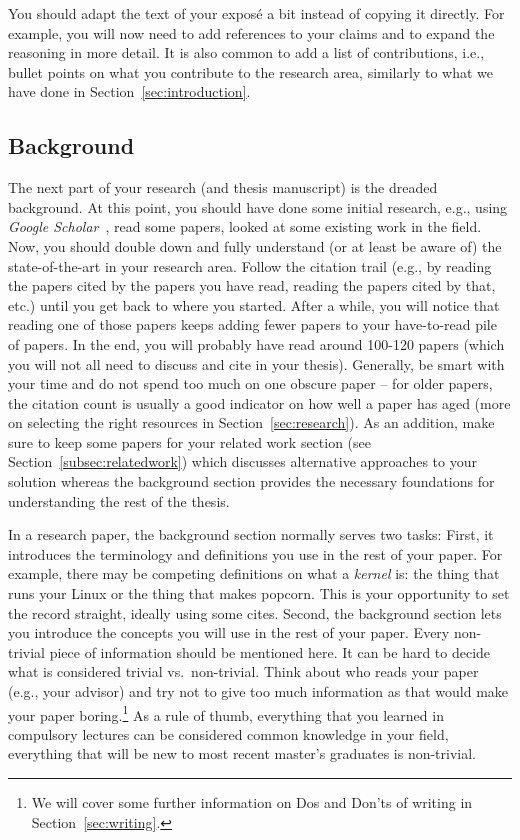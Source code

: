 \documentclass[a4]{article}
\begin{document}
You should adapt the text of your expos\'e a bit instead of copying it directly.
For example, you will now need to add references to your claims and to expand the reasoning in more detail.
It is also common to add a list of contributions, i.e., bullet points on what you contribute to the research area, similarly to what we have done in Section~\ref{sec:introduction}.

\subsection{Background}

The next part of your research (and thesis manuscript) is the dreaded background.
At this point, you should have done some initial research, e.g., using \emph{Google Scholar}~\cite{gscholar}, read some papers, looked at some existing work in the field.
Now, you should double down and fully understand (or at least be aware of) the state-of-the-art in your research area.
Follow the citation trail (e.g., by reading the papers cited by the papers you have read, reading the papers cited by that, etc.) until you get back to where you started.
After a while, you will notice that reading one of those papers keeps adding fewer papers to your have-to-read pile of papers.
In the end, you will probably have read around 100-120 papers (which you will not all need to discuss and cite in your thesis).
Generally, be smart with your time and do not spend too much on one obscure paper -- for older papers, the citation count is usually a good indicator on how well a paper has aged (more on selecting the right resources in Section~\ref{sec:research}).
As an addition, make sure to keep some papers for your related work section (see Section~\ref{subsec:relatedwork}) which discusses alternative approaches to your solution whereas the background section provides the necessary foundations for understanding the rest of the thesis.

In a research paper, the background section normally serves two tasks:
First, it introduces the terminology and definitions you use in the rest of your paper.
For example, there may be competing definitions on what a \emph{kernel} is: the thing that runs your Linux or the thing that makes popcorn.
This is your opportunity to set the record straight, ideally using some cites.
Second, the background section lets you introduce the concepts you will use in the rest of your paper.
Every non-trivial piece of information should be mentioned here.
It can be hard to decide what is considered trivial vs.~non-trivial.
Think about who reads your paper (e.g., your advisor) and try not to give too much information as that would make your paper boring.\footnote{We will cover some further information on Dos and Don'ts of writing in Section~\ref{sec:writing}.}
As a rule of thumb, everything that you learned in compulsory lectures can be considered common knowledge in your field, everything that will be new to most recent master's graduates is non-trivial.
\end{document}
